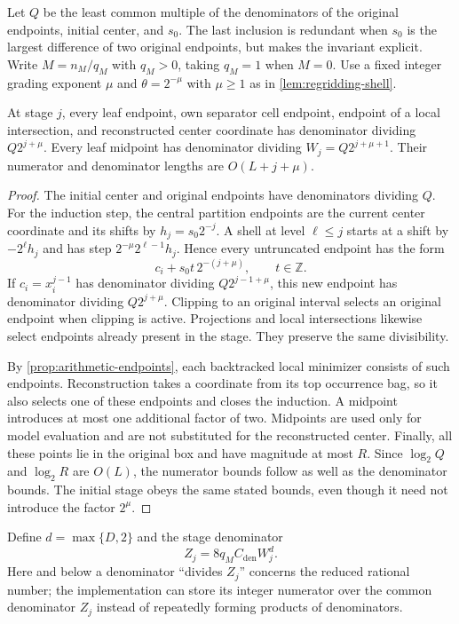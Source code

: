 Let $Q$ be the least common multiple of the denominators of the original
endpoints, initial center, and $s_0$.  The last inclusion is redundant when
$s_0$ is the largest difference of two original endpoints, but makes the
invariant explicit.  Write $M=n_M/q_M$ with $q_M>0$, taking $q_M=1$ when
$M=0$.  Use a fixed integer grading exponent $\mu$ and
$\theta=2^{-\mu}$ with $\mu\ge1$ as in \cref{lem:regridding-shell}.

\begin{lemma}
\label{lem:arithmetic-denominators}
At stage $j$, every leaf endpoint, own separator cell endpoint, endpoint of
a local intersection, and reconstructed center coordinate has denominator
dividing $Q2^{j+\mu}$.  Every leaf midpoint has denominator dividing
$W_j=Q2^{j+\mu+1}$.  Their numerator and denominator lengths are
$O(L+j+\mu)$.
\end{lemma}

\begin{proof}
The initial center and original endpoints have denominators dividing $Q$.
For the induction step, the central partition endpoints are the current
center coordinate and its shifts by $h_j=s_0 2^{-j}$.  A shell at level
$\ell\le j$ starts at a shift by $-2^\ell h_j$ and has step
$2^{-\mu}2^{\ell-1}h_j$.  Hence every untruncated endpoint has the form
\[
 c_i+s_0 t\,2^{-(j+\mu)},\qquad t\in\mathbb Z.
\]
If $c_i=x_i^{j-1}$ has denominator dividing $Q2^{j-1+\mu}$, this new
endpoint has denominator dividing $Q2^{j+\mu}$.  Clipping to an original
interval selects an original endpoint when clipping is active.  Projections
and local intersections likewise select endpoints already present in the
stage.  They preserve the same divisibility.

By \cref{prop:arithmetic-endpoints}, each backtracked local minimizer consists
of such endpoints.  Reconstruction takes a coordinate from its top
occurrence bag, so it also selects one of these endpoints and closes the
induction.  A midpoint introduces at most one additional factor of two.
Midpoints are used only for model evaluation and are not substituted for
the reconstructed center.  Finally, all these points lie in the original
box and have magnitude at most $R$.  Since $\log_2 Q$ and $\log_2 R$ are
$O(L)$, the numerator bounds follow as well as the denominator bounds.
The initial stage obeys the same stated bounds, even though it need not
introduce the factor $2^\mu$.
\end{proof}

Define $d=\max\{D,2\}$ and the stage denominator
\begin{equation}
 Z_j=8q_M C_{\mathrm{den}} W_j^d.
 \label{eq:arithmetic-denominator}
\end{equation}
Here and below a denominator ``divides $Z_j$'' concerns the reduced rational
number; the implementation can store its integer numerator over the common
denominator $Z_j$ instead of repeatedly forming products of denominators.

